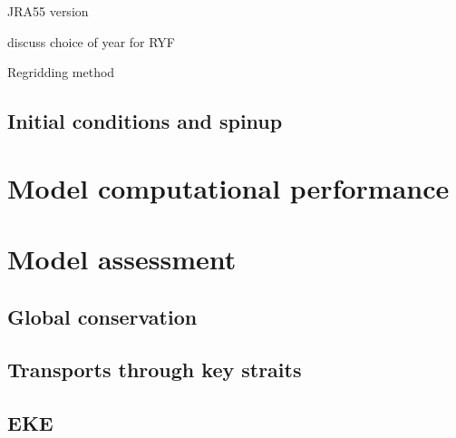 \documentclass[11pt]{report}
\begin{document}
JRA55 version

discuss choice of year for RYF

Regridding method

\subsection{Initial conditions and spinup}

\section{Model computational performance}

\section{Model assessment}

\subsection{Global conservation}

\subsection{Transports through key straits}

\subsection{EKE}
\end{document}
